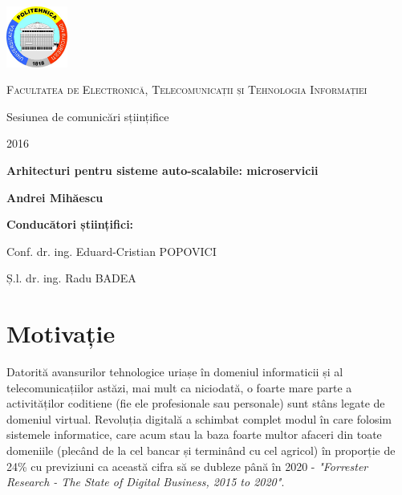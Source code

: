 \documentclass[12pt, a4paper, oneside, romanian]{teza-upb}
\begin{document}
\begin{titlepage}
	\centering
	\includegraphics[width=0.15\textwidth]{img/UPB-logo.png}\par\vspace{1cm}
	{\scshape\LARGE Facultatea de Electronică, Telecomunicații și Tehnologia Informației \par}
	\vspace{1cm}
	{\huge Sesiunea de comunicări sțiințifice\par}
	{\large 2016 \par}
	\vspace{1cm}
	{\huge\bfseries Arhitecturi pentru sisteme auto-scalabile: microservicii\par}
	\vspace{2cm}
	{\Large\bfseries Andrei Mihăescu\par}
	\vspace{2cm}
	{\Large\bfseries Conducători științifici: \par}
	{\Large Conf. dr. ing. Eduard-Cristian POPOVICI \par}
	{\Large Ș.l. dr. ing. Radu BADEA\par}
\end{titlepage}
\tableofcontents
\listoffigures
\newpage

\chapter{Motivație}

Datorită avansurilor tehnologice uriașe în domeniul informaticii și al telecomunicațiilor astăzi, mai mult ca niciodată, o foarte mare parte a activităților coditiene (fie ele profesionale sau personale) sunt stâns legate de domeniul virtual. Revoluția digitală a schimbat complet modul în care folosim sistemele informatice, care acum stau la baza foarte multor afaceri din toate domeniile (plecând de la cel bancar și terminând cu cel agricol) în proporție de 24\% cu previziuni ca această cifra să se dubleze până în 2020 - \textit{"Forrester Research - The State of Digital Business, 2015 to 2020"}.
\end{document}
